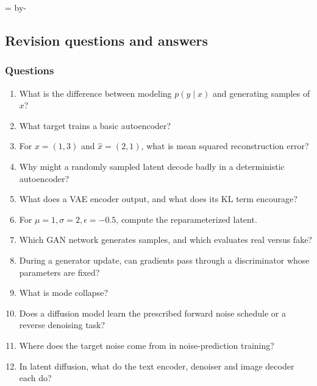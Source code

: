 \documentclass[11pt]{article}
\newcommand{\newsubsection}[1]{\par\begingroup\skip0=\pagegoal\advance\skip0 by-\pagetotal\ifdim\skip0<12\baselineskip\newpage\fi\endgroup\subsection{#1}}
\begin{document}
\newsubsection{Revision questions and answers}
\subsubsection{Questions}
\begin{enumerate}
\item What is the difference between modeling $p(y\mid x)$ and generating samples of $x$?
\item What target trains a basic autoencoder?
\item For $x=(1,3)$ and $\widehat{x}=(2,1)$, what is mean squared reconstruction error?
\item Why might a randomly sampled latent decode badly in a deterministic autoencoder?
\item What does a VAE encoder output, and what does its KL term encourage?
\item For $\mu=1,\sigma=2,\epsilon=-0.5$, compute the reparameterized latent.
\item Which GAN network generates samples, and which evaluates real versus fake?
\item During a generator update, can gradients pass through a discriminator whose parameters are fixed?
\item What is mode collapse?
\item Does a diffusion model learn the prescribed forward noise schedule or a reverse denoising task?
\item Where does the target noise come from in noise-prediction training?
\item In latent diffusion, what do the text encoder, denoiser and image decoder each do?
\end{enumerate}
\end{document}
